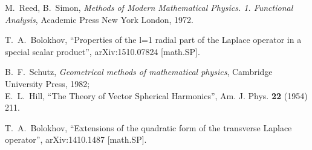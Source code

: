 \documentclass[12pt]{article}
\begin{document}
\begin{thebibliography}{0}
  M.~Reed, B.~Simon, \emph{Methods of Modern Mathematical
Physics. 1. Functional Analysis}, Academic Press New York London, 1972.

 T.~A.~Bolokhov,
``Properties of the l=1 radial part of the Laplace operator in a special
scalar product'', arXiv:1510.07824 [math.SP].
    
    B.~F.~Schutz, \emph{Geometrical methods of mathematical physics},
    Cambridge University Press, 1982;\\
    E.~L.~Hill, ``The Theory of Vector Spherical Harmonics'',
    Am. J. Phys. {\bf 22} (1954) 211.

 T.~A.~Bolokhov,
``Extensions of the quadratic form of the transverse Laplace operator'',
arXiv:1410.1487 [math.SP].


\end{thebibliography}
\end{document}

